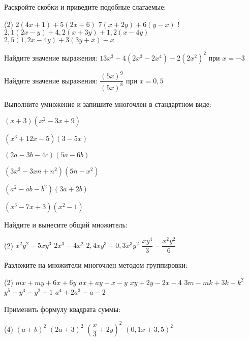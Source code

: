 %
%

\begin{class}[number=1]
	\begin{listofex}
		\item Раскройте скобки и приведите подобные слагаемые:
		\begin{tasks}(2)
			\task \( 2(4x+1)+5(2x+6) \)
			\task \( 7(x+2y)+6(y-x) \)
			\task! \( 2,1(2x-y)+4,2(x+3y)+1,2(x-4y) \)
			\task \( 2,5(1,2x-4y)+3(3y+x)-x\)
		\end{tasks}
		\item Найдите значение выражения: \( 13x^3-4(2x^3-2x^4)-2(2x^2)^2 \) при \( x=-3 \)
		\item Найдите значение выражения: \( \dfrac{(5x)^9}{(5x)^8} \) при \( x=0,5 \)
		\item Выполните умножение и запишите многочлен в стандартном виде:
		\begin{enumcols}[itemcolumns=2]
			\item \( (x+3)(x^2-3x+9) \)
			\item \( (x^3+12x-5)(3-5x) \)
			\item \( (2a-3b-4c)(5a-6b) \)
			\item \( (3x^2-3xn+n^2)(5n-x^2) \)
			\item \( (a^2-ab-b^2)(3a+2b) \)
			\item \( (x^3-7x+3)(x^2-1) \)
		\end{enumcols}
		\item Найдите и вынесите общий множитель:
		\begin{tasks}(2)
			\task \( x^2y^2-5xy^3 \)
			\task \( 2x^3-4x^2 \)
			\task \( 2,4xy^3+0,3x^3y^2 \)
			\task \( \dfrac{xy^4}{3}-\dfrac{x^2y^2}{6} \)
		\end{tasks}
		\item Разложите на множители многочлен методом группировки:
		\begin{tasks}(2)
			\task \( mx+my+6x+6y \)
			\task \( ax+ay-x-y \)
			\task \( xy+2y-2x-4 \)
			\task \( 3m-mk+3k-k^2 \)
			\task \( y^5-y^3-y^2+1 \)
			\task \( a^4+2a^3-a-2 \)
		\end{tasks}
		\item Применить формулу квадрата суммы:
		\begin{tasks}(4)
			\task \( (a+b)^2 \)
			\task \( (2a+3)^2 \)
			\task \( \left( \dfrac{x}{3}+2y \right)^2 \)
			\task \( (0,1x+3,5)^2 \)
		\end{tasks}

\end{listofex}
\end{class}

